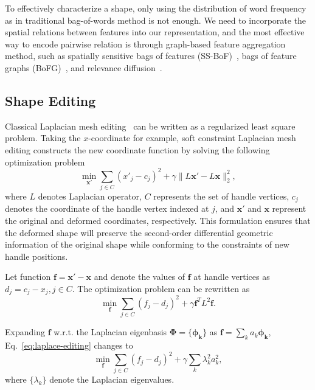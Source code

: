 To effectively characterize a shape, only using the distribution of word frequency as in
traditional bag-of-words method is not enough. We need to incorporate the spatial relations
between features into our representation, and the most effective way to encode pairwise
relation is through graph-based feature aggregation method, such as spatially sensitive
bags of features (SS-BoF)~\cite{Bronstein2011}, bags of feature graphs (BoFG)~\cite{Hou2012a},
and relevance diffusion~\cite{Furuya2015}.

\subsection{Shape Editing}

Classical Laplacian mesh editing~\cite{Botsch2008} can be written as a regularized least square
problem. Taking the $x$-coordinate for example, soft constraint Laplacian mesh editing
constructs the new coordinate function by solving the following optimization problem
\begin{equation}
\min_\mathbf{x'} \sum_{j\in C} (x'_j - c_j)^2 + \gamma\|L\mathbf{x'}-L\mathbf{x}\|_2^2,
\end{equation}
where $L$ denotes Laplacian operator, $C$ represents the set of handle vertices, $c_j$ denotes the
coordinate of the handle vertex indexed at $j$, and $\mathbf{x'}$ and $\mathbf{x}$ represent the
original and deformed coordinates, respectively. This formulation ensures that the deformed shape
will preserve the second-order differential geometric information of the original shape while
conforming to the constraints of new handle positions.

Let function $\mathbf{f}=\mathbf{x'}-\mathbf{x}$ and denote the values of $\mathbf{f}$ at
handle vertices as $d_j = c_j - x_j, j\in C$. The optimization problem can be rewritten as
\begin{equation}
\label{eq:laplace-editing}
\min_\mathbf{f} \sum_{j\in C} (f_j - d_j)^2 + \gamma \mathbf{f}^T L^2 \mathbf{f}.
\end{equation}

Expanding $\mathbf{f}$ w.r.t. the Laplacian eigenbasis $\mathbf{\Phi}=\{\mathbf{\phi_k}\}$
as $\mathbf{f}=\sum_k a_k \mathbf{\phi_k}$, Eq.~\ref{eq:laplace-editing} changes to
\begin{equation}
\label{eq:Laplace-editing2}
\min_\mathbf{f} \sum_{j\in C} (f_j - d_j)^2 + \gamma \sum_k \lambda_k^2 a_k^2,
\end{equation}
where $\{\lambda_k\}$ denote the Laplacian eigenvalues.

